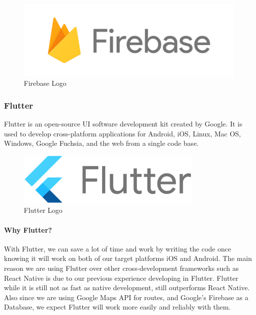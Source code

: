 \documentclass[a4paper, 12pt]{article} %
\begin{document}
                \begin{figure}[h]
                    \centering
                    \includegraphics[width=1\textwidth]{Firebase_Logo.png}
                    \caption{Firebase Logo \cite{firebase_logo}}
                    \label{fig:Firebase Logo}
                \end{figure}
            \pagebreak
            \subsubsection{Flutter}
                Flutter is an open-source UI software development kit created by Google. It is used to develop cross-platform applications for Android, iOS, Linux, Mac OS, Windows, Google Fuchsia, and the web from a single code base. \cite{flutter_wiki}
                \begin{figure}[h] %
                    \centering
                    \includegraphics[width=0.8\textwidth]{Google-flutter-logo.png}
                    \caption{Flutter Logo \cite{flutter_logo}}
                    \label{fig: Flutter Logo}
                \end{figure}
                \paragraph{Why Flutter?}
                With Flutter, we can save a lot of time and work by writing the code once knowing it will work on both of our target platforms iOS and Android. The main reason we are using Flutter over other cross-development frameworks such as React Native is due to our previous experience developing in Flutter. Flutter while it is still not as fast as native development, still outperforms React Native. Also since we are using Google Maps API for routes, and Google's Firebase as a Database, we expect Flutter will work more easily and reliably with them. 
            \pagebreak
\end{document}
